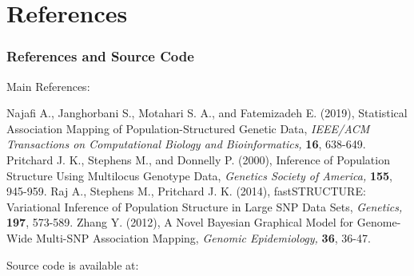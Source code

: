 \documentclass[xcolor=dvipsnames, professionalfont]{beamer}
\begin{document}
\section{References}
\begin{frame}
\frametitle{References and Source Code}
Main References:
\pagestyle{empty}
{
\tiny
\begin{thebibliography}{99}
\baselineskip12pt
 Najafi A., Janghorbani S., Motahari S. A., and Fatemizadeh E. (2019), Statistical Association Mapping of Population-Structured Genetic Data, {\it IEEE/ACM Transactions on Computational Biology and Bioinformatics,} {\bf 16}, 638-649.
 Pritchard J.  K., Stephens M., and Donnelly P. (2000), Inference of Population Structure Using Multilocus Genotype Data, {\it Genetics Society of America,} {\bf 155}, 945-959.
 Raj A., Stephens M., Pritchard J. K. (2014), fastSTRUCTURE: Variational Inference of Population Structure in Large SNP Data Sets, {\it Genetics,} {\bf 197}, 573-589.
 Zhang Y. (2012), A Novel Bayesian Graphical Model for Genome-Wide Multi-SNP Association Mapping, {\it Genomic Epidemiology,} {\bf 36}, 36-47.
\newline
\newline
\newline
\end{thebibliography}
}
Source code is available at:
\end{frame}



\end{document}

